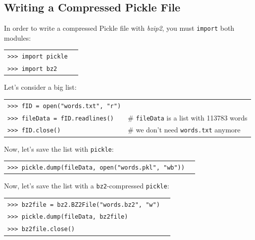 \documentclass[t,handout,9pt]{beamer}
\begin{document}
\subsection{Writing a Compressed Pickle File}
\begin{frame}
\vfill
In order to write a compressed Pickle file with \textit{bzip2}, you must \texttt{import} both modules:
\begin{table}[]
\begin{flushleft}
\begin{tabular}{ll}
\texttt{>{}>{}> import pickle} &  \\
\texttt{>{}>{}> import bz2} &  \\
\end{tabular}
\end{flushleft}
\end{table}
Let's consider a big list:
\vspace{-0.3cm}
\begin{table}[]
\begin{flushleft}
\begin{tabular}{ll}
\texttt{>{}>{}> fID = open("words.txt", "r")} &  \\
\texttt{>{}>{}> fileData = fID.readlines()} & \# \texttt{fileData} is a list with 113783 words \\
\texttt{>{}>{}> fID.close()} &  \# we don't need \texttt{words.txt} anymore\\
\end{tabular}
\end{flushleft}
\end{table}
Now, let's save the list with \texttt{pickle}:
\begin{table}[]
\begin{flushleft}
\begin{tabular}{ll}
\texttt{>{}>{}> pickle.dump(fileData, open("words.pkl", "wb"))} &  \\
\end{tabular}
\end{flushleft}
\end{table}
Now, let's save the list with a \texttt{bz2}-compressed \texttt{pickle}:
\begin{table}[]
\begin{flushleft}
\begin{tabular}{ll}
\texttt{>{}>{}> bz2file = bz2.BZ2File("words.bz2", "w")} &  \\
\texttt{>{}>{}> pickle.dump(fileData, bz2file)} &  \\
\texttt{>{}>{}> bz2file.close()} &  \\
\end{tabular}
\end{flushleft}
\end{table}
\vfill
\end{frame}
\end{document}
